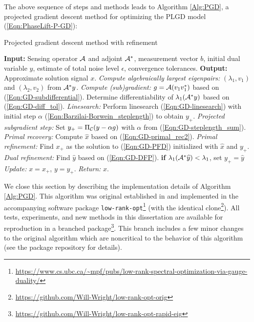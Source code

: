 The above sequence of steps and methods leads to Algorithm \ref{Alg:PGD}, a projected gradient descent method for optimizing the PLGD model  (\ref{Eqn:PhaseLift-P-GD}):
\begin{algorithm}[H]
\caption{Projected gradient descent method with refinement} 	\label{Alg:PGD}

\begin{algorithmic}[1]
	\Statex 	\textbf{Input:} Sensing operator ${\mathcal A}$ and adjoint ${\mathcal A}^*$, measurement vector $b$,
	initial dual variable $y$, estimate of total noise level $\epsilon$,  convergence
	tolerances.
	\Statex 	\textbf{Output:} Approximate solution signal $x$.
		\State 		\textit{Compute algebraically largest eigenpairs:} $(\lambda_1, v_1)$ and  $(\lambda_2, v_2)$ from ${\mathcal A}^*y$.
		\State 		\textit{Compute (sub)gradient:} $g = {\mathcal A}(v_1 v_1^*)$ based on  (\ref{Eqn:GD-subdifferential}).
		\State		Determine differentiability of $\lambda_1({\mathcal A}^*y)$ based on (\ref{Eqn:GD-diff_tol}).
			\State		\textit{Linesearch:} Perform linesearch (\ref{Eqn:GD-linesearch}) with initial step $\alpha$ (\ref{Eqn:Barzilai-Borwein_steplength}) to obtain $y_+$.	
		\Else
			\State		\textit{Projected subgradient step:} Set $y_+ = \Pi_{\mathcal C} (y - \alpha g)$ with $\alpha$ from (\ref{Eqn:GD-steplength_sum}).
		\EndIf
		\State		\textit{Primal recovery:} Compute $\hat{x}$ based on (\ref{Eqn:GD-primal_rec2}).
		\State		\textit{Primal refinement:} Find $x_+$ as the solution to (\ref{Eqn:GD-PFD}) initialized with $\hat{x}$ and $y_+$.
		 {}
			\State		\textit{Dual refinement:} Find $\widehat{y}$ based on (\ref{Eqn:GD-DFP}).
			\State		\textbf{if} $\lambda_1({\mathcal A}^* \widehat{y}) < \lambda_1$, set $y_+ = \widehat{y}$
		\EndIf
			\State	\textit{Update:} $x = x_+$, $y = y_+$.
	\EndWhile
	\State	\textit{Return:} $x$. 
\end{algorithmic}

\end{algorithm}







We close this section by describing the implementation details of Algorithm \ref{Alg:PGD}.  
This algorithm was original established in \cite{DBLP:journals/siamsc/FriedlanderM16} and implemented in the accompanying software package \texttt{low-rank-opt}\footnote{\url{https://www.cs.ubc.ca/~mpf/pubs/low-rank-spectral-optimization-via-gauge-duality/}} (with the identical clone\footnote{\url{https://github.com/Will-Wright/low-rank-opt-orig}}).  
All tests, experiments, and new methods in this dissertation are available for reproduction in a branched package\footnote{\url{https://github.com/Will-Wright/low-rank-opt-rapid-eig}}.  
This branch includes a few minor changes to the original algorithm which are noncritical to the behavior of this algorithm (see the package repository for details).


